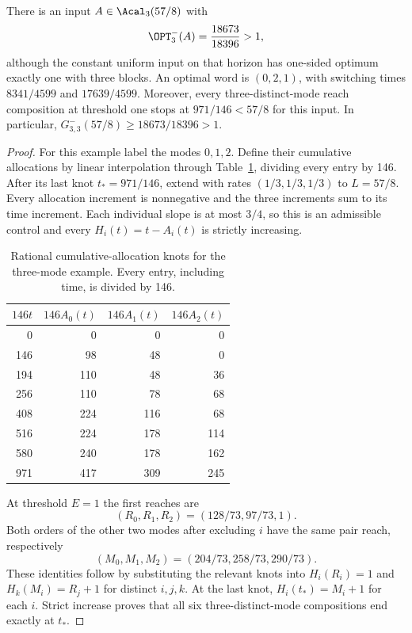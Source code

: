 \begin{proposition}[Failure at $k=n=3$]\label{prop:three-mode-failure}
There is an input $A\in\Acal_3(57/8)$ with
\begin{equation}\label{eq:n3-exact-optimum}
 \OPT^-_3(A)=\frac{18673}{18396}>1,
\end{equation}
although the constant uniform input on that horizon has one-sided optimum
exactly one with three blocks. An optimal word is $(0,2,1)$, with switching
times $8341/4599$ and $17639/4599$. Moreover, every
three-distinct-mode reach composition at threshold one stops at
$971/146<57/8$ for this input. In particular,
$G^-_{3,3}(57/8)\ge18673/18396>1$.
\end{proposition}
\begin{proof}
For this example label the modes $0,1,2$. Define their cumulative
allocations by linear interpolation through Table~\ref{tab:n3-knots},
dividing every entry by 146. After its last knot $t_*=971/146$, extend
with rates $(1/3,1/3,1/3)$ to $L=57/8$. Every allocation increment is
nonnegative and the three increments sum to its time increment. Each
individual slope is at most $3/4$, so this is an admissible control and
every $H_i(t)=t-A_i(t)$ is strictly increasing.

\begin{table}[tb]
\centering
\begin{tabular}{rrrr}
\toprule
$146t$ & $146A_0(t)$ & $146A_1(t)$ & $146A_2(t)$\\
\midrule
0&0&0&0\\
146&98&48&0\\
194&110&48&36\\
256&110&78&68\\
408&224&116&68\\
516&224&178&114\\
580&240&178&162\\
971&417&309&245\\
\bottomrule
\end{tabular}
\caption{Rational cumulative-allocation knots for the three-mode example.
Every entry, including time, is divided by 146.}
\label{tab:n3-knots}
\end{table}

At threshold $E=1$ the first reaches are
\[
 (R_0,R_1,R_2)=(128/73,97/73,1).
\]
Both orders of the other two modes after excluding $i$ have the same
pair reach, respectively
\[
 (M_0,M_1,M_2)=(204/73,258/73,290/73).
\]
These identities follow by substituting the relevant knots into
$H_i(R_i)=1$ and $H_k(M_i)=R_j+1$ for distinct $i,j,k$.
At the last knot, $H_i(t_*)=M_i+1$ for each $i$. Strict increase proves
that all six three-distinct-mode compositions end exactly at $t_*$.


\end{proof}
